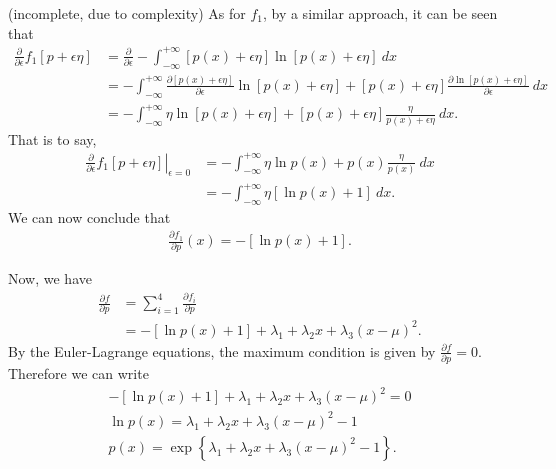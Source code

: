 \begin{answer}{(incomplete, due to complexity)}
	As for $f_1$, by a similar approach, it can be seen that
	\begin{align}
		\frac{\partial}{\partial \epsilon} f_1[p + \epsilon\eta] &= \frac{\partial}{\partial \epsilon} - \int_{-\infty}^{+\infty} [p(x) + \epsilon\eta]\ln [p(x) + \epsilon\eta]\ dx\\
		&= - \int_{-\infty}^{+\infty} \frac{\partial [p(x) + \epsilon\eta]}{\partial \epsilon}\ln [p(x) + \epsilon\eta] + [p(x) + \epsilon\eta]\frac{\partial \ln [p(x) + \epsilon\eta]}{\partial \epsilon}\ dx\\
		&= - \int_{-\infty}^{+\infty} \eta \ln [p(x) + \epsilon\eta] + [p(x) + \epsilon\eta]\frac{\eta}{p(x) + \epsilon\eta}\ dx.
	\end{align}
	That is to say,
	\begin{align}
		\left. \frac{\partial}{\partial \epsilon} f_1[p + \epsilon\eta]\right\rvert_{\epsilon = 0} &= - \int_{-\infty}^{+\infty} \eta \ln p(x) + p(x)\frac{\eta}{p(x)}\ dx\\
		&= - \int_{-\infty}^{+\infty} \eta[\ln p(x) + 1]\ dx.
	\end{align}
	We can now conclude that
	\begin{align}
		\frac{\partial f_1}{\partial p}(x) = -[\ln p(x) + 1].
	\end{align}
	
	Now, we have
	\begin{align}
		\frac{\partial f}{\partial p} &= \sum_{i = 1}^{4} \frac{\partial f_i}{\partial p}\\
		&= -[\ln p(x) + 1] + \lambda_1 + \lambda_2 x + \lambda_3(x-\mu)^2.
	\end{align}
	By the Euler-Lagrange equations, the maximum condition is given by $ \frac{\partial f}{\partial p} = 0 $. Therefore we can write
	\begin{gather}
		-[\ln p(x) + 1] + \lambda_1 + \lambda_2 x + \lambda_3(x-\mu)^2 = 0\\
		\ln p(x) = \lambda_1 + \lambda_2 x + \lambda_3(x-\mu)^2 - 1\\
		p(x) = \exp\left\{ \lambda_1 + \lambda_2 x + \lambda_3(x-\mu)^2 - 1 \right\}. \label{1.34eqn3}
	\end{gather}


\end{answer}
